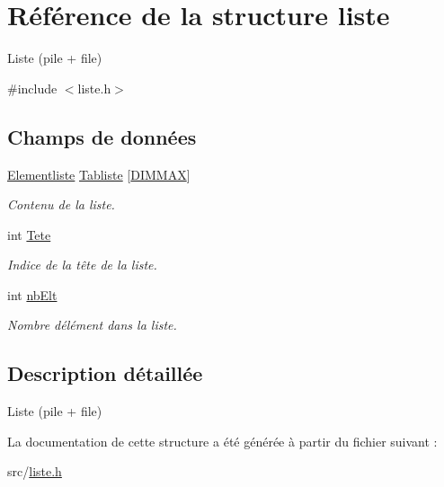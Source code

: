 \hypertarget{structliste}{}\section{Référence de la structure liste}
\label{structliste}


Liste (pile + file)  




{\ttfamily \#include $<$liste.\+h$>$}

\subsection*{Champs de données}
\begin{DoxyCompactItemize}
\item 
\mbox{\label{structliste_a5306c3d8ec2ffff7bc66e76132cc395e}} 
\hyperlink{elementliste_8h_ad1cbc6cf883405e3e7ab3cd6e1451dbb}{Elementliste} \hyperlink{structliste_a5306c3d8ec2ffff7bc66e76132cc395e}{Tabliste} \mbox{[}\hyperlink{liste_8h_a5a724e718ea66e676efba2647aa56414}{D\+I\+M\+M\+AX}\mbox{]}
\begin{DoxyCompactList}\small\item\em Contenu de la liste. \end{DoxyCompactList}\item 
\mbox{\label{structliste_ac27f6a14865441ed2e343acc6738aad2}} 
int \hyperlink{structliste_ac27f6a14865441ed2e343acc6738aad2}{Tete}
\begin{DoxyCompactList}\small\item\em Indice de la tête de la liste. \end{DoxyCompactList}\item 
\mbox{\label{structliste_ac6a9b89b3dd1181842948cdc6a1ee389}} 
int \hyperlink{structliste_ac6a9b89b3dd1181842948cdc6a1ee389}{nb\+Elt}
\begin{DoxyCompactList}\small\item\em Nombre d\textquotesingle{}élément dans la liste. \end{DoxyCompactList}\end{DoxyCompactItemize}


\subsection{Description détaillée}
Liste (pile + file) 

La documentation de cette structure a été générée à partir du fichier suivant \+:\begin{DoxyCompactItemize}
\item 
src/\hyperlink{liste_8h}{liste.\+h}\end{DoxyCompactItemize}
